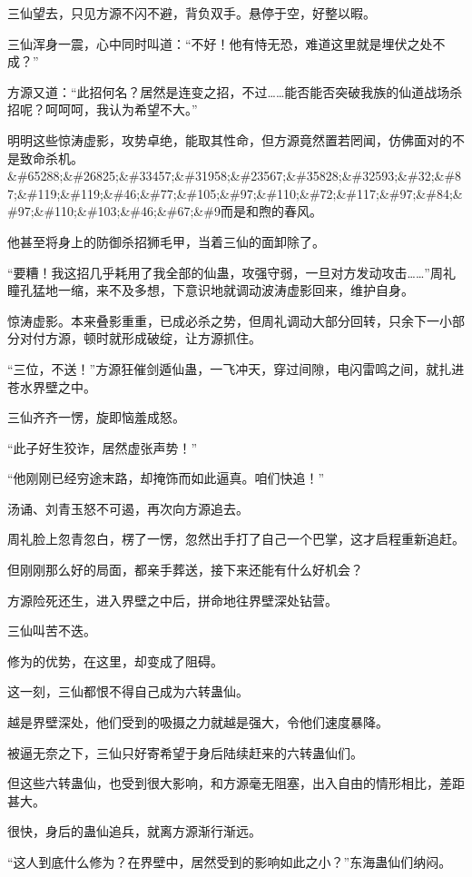 \begin{this_body}
三仙望去，只见方源不闪不避，背负双手。悬停于空，好整以暇。

三仙浑身一震，心中同时叫道：“不好！他有恃无恐，难道这里就是埋伏之处不成？”

方源又道：“此招何名？居然是连变之招，不过……能否能否突破我族的仙道战场杀招呢？呵呵呵，我认为希望不大。”

明明这些惊涛虚影，攻势卓绝，能取其性命，但方源竟然置若罔闻，仿佛面对的不是致命杀机。\&\#65288;\&\#26825;\&\#33457;\&\#31958;\&\#23567;\&\#35828;\&\#32593;\&\#32;\&\#87;\&\#119;\&\#119;\&\#46;\&\#77;\&\#105;\&\#97;\&\#110;\&\#72;\&\#117;\&\#97;\&\#84;\&\#97;\&\#110;\&\#103;\&\#46;\&\#67;\&\#9而是和煦的春风。

他甚至将身上的防御杀招狮毛甲，当着三仙的面卸除了。

“要糟！我这招几乎耗用了我全部的仙蛊，攻强守弱，一旦对方发动攻击……”周礼瞳孔猛地一缩，来不及多想，下意识地就调动波涛虚影回来，维护自身。

惊涛虚影。本来叠影重重，已成必杀之势，但周礼调动大部分回转，只余下一小部分对付方源，顿时就形成破绽，让方源抓住。

“三位，不送！”方源狂催剑遁仙蛊，一飞冲天，穿过间隙，电闪雷鸣之间，就扎进苍水界壁之中。

三仙齐齐一愣，旋即恼羞成怒。

“此子好生狡诈，居然虚张声势！”

“他刚刚已经穷途末路，却掩饰而如此逼真。咱们快追！”

汤诵、刘青玉怒不可遏，再次向方源追去。

周礼脸上忽青忽白，楞了一愣，忽然出手打了自己一个巴掌，这才启程重新追赶。

但刚刚那么好的局面，都亲手葬送，接下来还能有什么好机会？

方源险死还生，进入界壁之中后，拼命地往界壁深处钻营。

三仙叫苦不迭。

修为的优势，在这里，却变成了阻碍。

这一刻，三仙都恨不得自己成为六转蛊仙。

越是界壁深处，他们受到的吸摄之力就越是强大，令他们速度暴降。

被逼无奈之下，三仙只好寄希望于身后陆续赶来的六转蛊仙们。

但这些六转蛊仙，也受到很大影响，和方源毫无阻塞，出入自由的情形相比，差距甚大。

很快，身后的蛊仙追兵，就离方源渐行渐远。

“这人到底什么修为？在界壁中，居然受到的影响如此之小？”东海蛊仙们纳闷。


\end{this_body}
